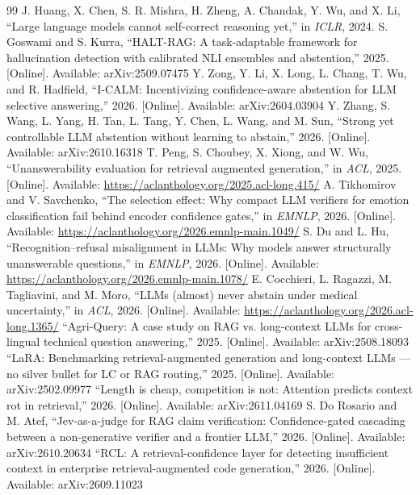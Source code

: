 \documentclass[preprint,3p,times]{elsarticle}
\begin{document}
\begin{thebibliography}{99}
 J. Huang, X. Chen, S. R. Mishra, H. Zheng, A. Chandak, Y. Wu, and X. Li, ``Large language models cannot self-correct reasoning yet,'' in \emph{ICLR}, 2024.
 S. Goswami and S. Kurra, ``HALT-RAG: A task-adaptable framework for hallucination detection with calibrated NLI ensembles and abstention,'' 2025. [Online]. Available: arXiv:2509.07475
 Y. Zong, Y. Li, X. Long, L. Chang, T. Wu, and R. Hadfield, ``I-CALM: Incentivizing confidence-aware abstention for LLM selective answering,'' 2026. [Online]. Available: arXiv:2604.03904
 Y. Zhang, S. Wang, L. Yang, H. Tan, L. Tang, Y. Chen, L. Wang, and M. Sun, ``Strong yet controllable LLM abstention without learning to abstain,'' 2026. [Online]. Available: arXiv:2610.16318
 T. Peng, S. Choubey, X. Xiong, and W. Wu, ``Unanswerability evaluation for retrieval augmented generation,'' in \emph{ACL}, 2025. [Online]. Available: \url{https://aclanthology.org/2025.acl-long.415/}
 A. Tikhomirov and V. Savchenko, ``The selection effect: Why compact LLM verifiers for emotion classification fail behind encoder confidence gates,'' in \emph{EMNLP}, 2026. [Online]. Available: \url{https://aclanthology.org/2026.emnlp-main.1049/}
 S. Du and L. Hu, ``Recognition--refusal misalignment in LLMs: Why models answer structurally unanswerable questions,'' in \emph{EMNLP}, 2026. [Online]. Available: \url{https://aclanthology.org/2026.emnlp-main.1078/}
 E. Cocchieri, L. Ragazzi, M. Tagliavini, and M. Moro, ``LLMs (almost) never abstain under medical uncertainty,'' in \emph{ACL}, 2026. [Online]. Available: \url{https://aclanthology.org/2026.acl-long.1365/}
 ``Agri-Query: A case study on RAG vs. long-context LLMs for cross-lingual technical question answering,'' 2025. [Online]. Available: arXiv:2508.18093
 ``LaRA: Benchmarking retrieval-augmented generation and long-context LLMs --- no silver bullet for LC or RAG routing,'' 2025. [Online]. Available: arXiv:2502.09977
 ``Length is cheap, competition is not: Attention predicts context rot in retrieval,'' 2026. [Online]. Available: arXiv:2611.04169
 S. Do Rosario and M. Atef, ``Jev-as-a-judge for RAG claim verification: Confidence-gated cascading between a non-generative verifier and a frontier LLM,'' 2026. [Online]. Available: arXiv:2610.20634
 ``RCL: A retrieval-confidence layer for detecting insufficient context in enterprise retrieval-augmented code generation,'' 2026. [Online]. Available: arXiv:2609.11023

\end{thebibliography}
\end{document}
